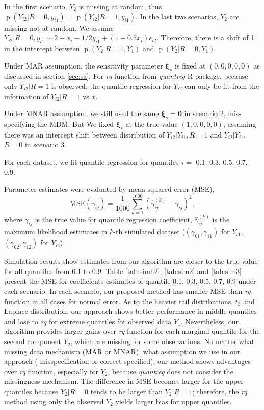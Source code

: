 \documentclass[12pt]{article}
\DeclareMathOperator{\pr}{p}
\begin{document}
In the first scenario, $Y_2$ is missing at random, thus $\pr(Y_{i2} |
R = 0, y_{i1}) = \pr(Y_{i2}|R = 1, y_{i1}) $. In the last two
scenarios, $Y_2$ are missing not at random. We assume $Y_{i2}| R = 0,
y_{i1} \sim 2 - x_i - 1/2y_{i1} + (1 + 0.5x_i)
\epsilon_{i2}$. Therefore, there is a shift of 1 in the intercept
between $\pr(Y_2|R = 1, Y_1)$ and $\pr(Y_2|R = 0, Y_1)$.

Under MAR assumption, the sensitivity parameter $\bm \xi_s$ is fixed
at $(0,0,0,0,0)$ as discussed in section \ref{sec:sa}. For \textit{rq}
function from \textit{quantreg} R package, because only $Y_{i2}|R = 1$
is observed, the quantile regression for $Y_{i2}$ can only be fit from
the information of $Y_{i2}|R = 1$ vs $x$.

Under MNAR assumption, we still used the same $\bm \xi_s = \bm 0$ in
scenario 2, mis-specifying the MDM. But We fixed $\bm \xi_s$ at the
true value $(1, 0, 0, 0, 0)$, assuming there was an intercept shift
between distribution of $Y_{i2}|Y_{i1}, R = 1$ and $Y_{i2}|Y_{i1}$, $R
= 0$ in scenario 3.

For each dataset, we fit quantile regression for quantiles $\tau =$
0.1, 0.3, 0.5, 0.7, 0.9.

Parameter estimates were evaluated by mean squared error (MSE),
\begin{equation*}
  \text{MSE} (\gamma_{ij}) = \frac{1}{1000} \sum_{k = 1}^{1000}
  \left( \hat{\gamma}_{ij}^{(k)}  - \gamma_{ij}\right)^2,
\end{equation*}
where $\gamma_{ij}$ is the true value for quantile regression
coefficient, $\hat{\gamma}_{ij}^{(k)}$ is the maximum likelihood
estimates in $k$-th simulated dataset ($(\gamma_{01}, \gamma_{11})$
for $Y_{i1}$, $(\gamma_{02}, \gamma_{12})$ for $Y_{i2}$).

Simulation results show estimates from our algorithm are closer to the
true value for all quantiles from 0.1 to 0.9. Table \ref{tab:simh2},
\ref{tab:sim2} and \ref{tab:sim3} present the MSE for coefficients
estimates of quantile 0.1, 0.3, 0.5, 0.7, 0.9 under each scenario.  In
each scenario, our proposed method has smaller MSE than \textit{rq}
function in all cases for normal error. As to the heavier tail
distributions, $t_3$ and Laplace distribution, our approach shows
better performance in middle quantiles and lose to \textit{rq} for
extreme quantiles for observed data $Y_1$. Nevertheless, our algorithm
provides larger gains over \textit{rq} function for each marginal
quantile for the second component $Y_2$, which are missing for some
observations.  No matter what missing data mechanism (MAR or MNAR),
what assumption we use in our approach ( misspecification or correct
specified), our method shows advantages over \textit{rq} function,
especially for $Y_2$, because \textit{quantreg} does not consider the
missingness mechanism. The difference in MSE becomes larger for the
upper quantiles because $Y_2 |R = 0$ tends to be larger than $Y_2 | R
= 1$; therefore, the \textit{rq} method using only the observed $Y_2$
yields larger bias for upper quantiles.
\end{document}
